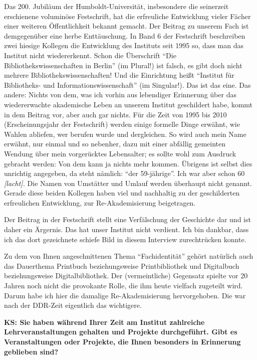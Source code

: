 \documentclass[a4paper,
fontsize=11pt,
oneside,
numbers=noperiodatend,
parskip=half-,
bibliography=totoc,
final
]{scrartcl}
\begin{document}
Das 200. Jubiläum der Humboldt-Universität, insbesondere die seinerzeit
erschienene voluminöse Festschrift, hat die erfreuliche Entwicklung
vieler Fächer einer weiteren Öffentlichkeit bekannt gemacht. Der Beitrag
zu unserem Fach ist demgegenüber eine herbe Enttäuschung. In Band 6 der
Festschrift beschreiben zwei hiesige Kollegen die Entwicklung des
Instituts seit 1995 so, dass man das Institut nicht wiedererkennt. Schon
die Überschrift \enquote{Die Bibliothekswissenschaften in Berlin} (im
Plural!) ist falsch, es gibt doch nicht mehrere
Bibliothekswissenschaften! Und die Einrichtung heißt \enquote{Institut
für Bibliotheks- und Informationswissenschaft} (im Singular!). Das ist
das eine. Das andere: Nichts von dem, was ich vorhin aus lebendiger
Erinnerung über das wiedererwachte akademische Leben an unserem Institut
geschildert habe, kommt in dem Beitrag vor, aber auch gar nichts. Für
die Zeit von 1995 bis 2010 (Erscheinungsjahr der Festschrift) werden
einige formelle Dinge erwähnt, wie Wahlen abliefen, wer berufen wurde
und dergleichen. So wird auch mein Name erwähnt, nur einmal und so
nebenher, dazu mit einer abfällig gemeinten Wendung über mein
vorgerücktes Lebensalter; es sollte wohl zum Ausdruck gebracht werden:
Von dem kann ja nichts mehr kommen. Übrigens ist selbst dies unrichtig
angegeben, da steht nämlich: \enquote{der 59-jährige}. Ich war aber
schon 60 \emph{{[}lacht{]}.} Die Namen von Umstätter und Umlauf werden
überhaupt nicht genannt. Gerade diese beiden Kollegen haben viel und
nachhaltig zu der geschilderten erfreulichen Entwicklung, zur
Re-Akademisierung beigetragen.

Der Beitrag in der Festschrift stellt eine Verfälschung der Geschichte
dar und ist daher ein Ärgernis. Das hat unser Institut nicht verdient.
Ich bin dankbar, dass ich das dort gezeichnete schiefe Bild in diesem
Interview zurechtrücken konnte.

Zu dem von Ihnen angeschnittenen Thema \enquote{Fachidentität} gehört
natürlich auch das Dauerthema Printbuch beziehungsweise Printbibliothek
und Digitalbuch beziehungsweise Digitalbibliothek. Der (vermeintliche)
Gegensatz spielte vor 20 Jahren noch nicht die provokante Rolle, die ihm
heute vielfach zugeteilt wird. Darum habe ich hier die damalige
Re-Akademisierung hervorgehoben. Die war nach der DDR-Zeit eigentlich
das wichtigere.

\textbf{KS: Sie haben während Ihrer Zeit am Institut zahlreiche
Lehrveranstaltungen gehalten und Projekte durchgeführt. Gibt es
Veranstaltungen oder Projekte, die Ihnen besonders in Erinnerung
geblieben sind?}
\end{document}

